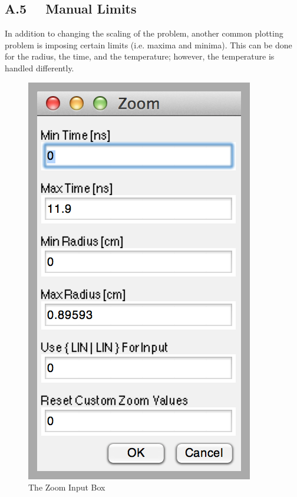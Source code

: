 \subsection{A.5 \ \ Manual Limits }

In addition to changing the scaling of the problem, another common plotting problem is imposing certain limits (i.e. maxima and minima).  This can be done for the radius, the time, and the temperature; however, the temperature is handled differently.  

\begin{figure} %
	\vspace{-24pt}
	\centering
	\includegraphics[scale=.83]{graphics/manZoom.png} 
	\vspace{-4pt}
	\caption[Manual Zoom Input Box]{ \small{The Zoom Input Box }\\  }
	\label{fig:manZoom}
\end{figure}

